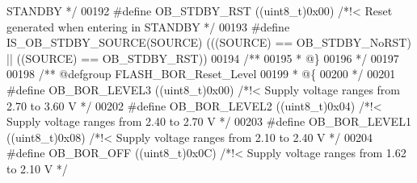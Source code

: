 \begin{DoxyCode}
{       STANDBY */}
00192 \textcolor{preprocessor}{#}\textcolor{preprocessor}{define} \textcolor{preprocessor}{OB\_STDBY\_RST}                   \textcolor{preprocessor}{(}\textcolor{preprocessor}{(}\textcolor{preprocessor}{uint8\_t}\textcolor{preprocessor}{)}0x00\textcolor{preprocessor}{)} \textcolor{comment}{/*!< Reset generated when entering in STANDBY
       */}
00193 \textcolor{preprocessor}{#}\textcolor{preprocessor}{define} \textcolor{preprocessor}{IS\_OB\_STDBY\_SOURCE}\textcolor{preprocessor}{(}\textcolor{preprocessor}{SOURCE}\textcolor{preprocessor}{)} \textcolor{preprocessor}{(}\textcolor{preprocessor}{(}\textcolor{preprocessor}{(}\textcolor{preprocessor}{SOURCE}\textcolor{preprocessor}{)} \textcolor{preprocessor}{==} OB_STDBY_NoRST\textcolor{preprocessor}{)} \textcolor{preprocessor}{||} \textcolor{preprocessor}{(}\textcolor{preprocessor}{(}\textcolor{preprocessor}{SOURCE}\textcolor{preprocessor}{)} \textcolor{preprocessor}{==} 
      OB_STDBY_RST\textcolor{preprocessor}{)}\textcolor{preprocessor}{)}
00194 \textcolor{comment}{/**}
00195 \textcolor{comment}{  * @\}}
00196 \textcolor{comment}{  */}
00197 
00198 \textcolor{comment}{/** @defgroup FLASH\_BOR\_Reset\_Level }
00199 \textcolor{comment}{  * @\{}
00200 \textcolor{comment}{  */}
00201 \textcolor{preprocessor}{#}\textcolor{preprocessor}{define} \textcolor{preprocessor}{OB\_BOR\_LEVEL3}          \textcolor{preprocessor}{(}\textcolor{preprocessor}{(}\textcolor{preprocessor}{uint8\_t}\textcolor{preprocessor}{)}0x00\textcolor{preprocessor}{)}  \textcolor{comment}{/*!< Supply voltage ranges from 2.70 to 3.60 V */}
00202 \textcolor{preprocessor}{#}\textcolor{preprocessor}{define} \textcolor{preprocessor}{OB\_BOR\_LEVEL2}          \textcolor{preprocessor}{(}\textcolor{preprocessor}{(}\textcolor{preprocessor}{uint8\_t}\textcolor{preprocessor}{)}0x04\textcolor{preprocessor}{)}  \textcolor{comment}{/*!< Supply voltage ranges from 2.40 to 2.70 V */}
00203 \textcolor{preprocessor}{#}\textcolor{preprocessor}{define} \textcolor{preprocessor}{OB\_BOR\_LEVEL1}          \textcolor{preprocessor}{(}\textcolor{preprocessor}{(}\textcolor{preprocessor}{uint8\_t}\textcolor{preprocessor}{)}0x08\textcolor{preprocessor}{)}  \textcolor{comment}{/*!< Supply voltage ranges from 2.10 to 2.40 V */}
00204 \textcolor{preprocessor}{#}\textcolor{preprocessor}{define} \textcolor{preprocessor}{OB\_BOR\_OFF}             \textcolor{preprocessor}{(}\textcolor{preprocessor}{(}\textcolor{preprocessor}{uint8\_t}\textcolor{preprocessor}{)}0x0C\textcolor{preprocessor}{)}  \textcolor{comment}{/*!< Supply voltage ranges from 1.62 to 2.10 V */}

\end{DoxyCode}
